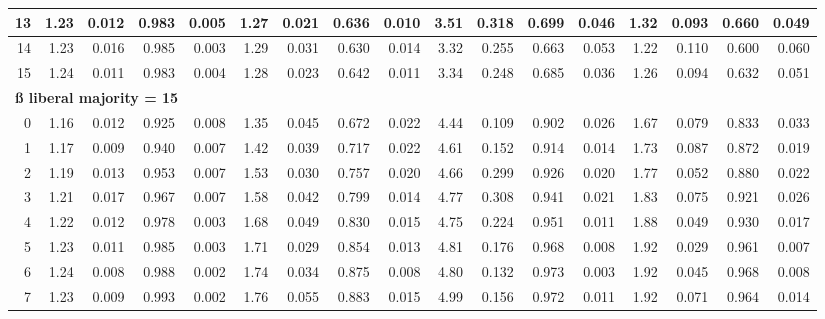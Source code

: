 \documentclass[
]{article}
\begin{document}
\begin{table}[H]
{\begin{tabular}[t]{r|r|r|r|r|r|r|r|r|r|r|r|r|r|r|r|r}
\hline
\hspace{1em}13 & 1.23 & 0.012 & 0.983 & 0.005 & 1.27 & 0.021 & 0.636 & 0.010 & 3.51 & 0.318 & 0.699 & 0.046 & 1.32 & 0.093 & 0.660 & 0.049\\
\hline
\hspace{1em}14 & 1.23 & 0.016 & 0.985 & 0.003 & 1.29 & 0.031 & 0.630 & 0.014 & 3.32 & 0.255 & 0.663 & 0.053 & 1.22 & 0.110 & 0.600 & 0.060\\
\hline
\hspace{1em}15 & 1.24 & 0.011 & 0.983 & 0.004 & 1.28 & 0.023 & 0.642 & 0.011 & 3.34 & 0.248 & 0.685 & 0.036 & 1.26 & 0.094 & 0.632 & 0.051\\
\hline
\multicolumn{17}{l}{\textbf{ß liberal majority = 15}}\\
\hline
\hspace{1em}0 & 1.16 & 0.012 & 0.925 & 0.008 & 1.35 & 0.045 & 0.672 & 0.022 & 4.44 & 0.109 & 0.902 & 0.026 & 1.67 & 0.079 & 0.833 & 0.033\\
\hline
\hspace{1em}1 & 1.17 & 0.009 & 0.940 & 0.007 & 1.42 & 0.039 & 0.717 & 0.022 & 4.61 & 0.152 & 0.914 & 0.014 & 1.73 & 0.087 & 0.872 & 0.019\\
\hline
\hspace{1em}2 & 1.19 & 0.013 & 0.953 & 0.007 & 1.53 & 0.030 & 0.757 & 0.020 & 4.66 & 0.299 & 0.926 & 0.020 & 1.77 & 0.052 & 0.880 & 0.022\\
\hline
\hspace{1em}3 & 1.21 & 0.017 & 0.967 & 0.007 & 1.58 & 0.042 & 0.799 & 0.014 & 4.77 & 0.308 & 0.941 & 0.021 & 1.83 & 0.075 & 0.921 & 0.026\\
\hline
\hspace{1em}4 & 1.22 & 0.012 & 0.978 & 0.003 & 1.68 & 0.049 & 0.830 & 0.015 & 4.75 & 0.224 & 0.951 & 0.011 & 1.88 & 0.049 & 0.930 & 0.017\\
\hline
\hspace{1em}5 & 1.23 & 0.011 & 0.985 & 0.003 & 1.71 & 0.029 & 0.854 & 0.013 & 4.81 & 0.176 & 0.968 & 0.008 & 1.92 & 0.029 & 0.961 & 0.007\\
\hline
\hspace{1em}6 & 1.24 & 0.008 & 0.988 & 0.002 & 1.74 & 0.034 & 0.875 & 0.008 & 4.80 & 0.132 & 0.973 & 0.003 & 1.92 & 0.045 & 0.968 & 0.008\\
\hline
\hspace{1em}7 & 1.23 & 0.009 & 0.993 & 0.002 & 1.76 & 0.055 & 0.883 & 0.015 & 4.99 & 0.156 & 0.972 & 0.011 & 1.92 & 0.071 & 0.964 & 0.014\\

\end{tabular}}
\end{table}
\end{document}

